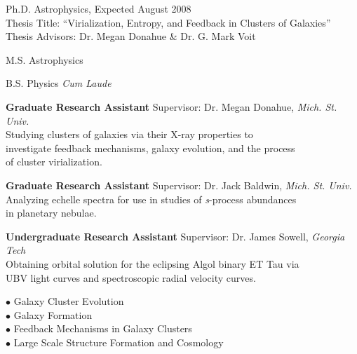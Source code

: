 \documentclass[11pt]{cv}
\begin{document}
\begin{llist}


Ph.D. Astrophysics, Expected August 2008\\
Thesis Title: ``Virialization, Entropy, and Feedback in Clusters of Galaxies''\\
Thesis Advisors: Dr. Megan Donahue \& Dr. G. Mark Voit

M.S. Astrophysics

B.S. Physics {\it Cum Laude}


{\sc \bf{Graduate Research Assistant}}
Supervisor: Dr. Megan Donahue, {\textit{Mich. St. Univ.}}\\
Studying clusters of galaxies via their X-ray properties to\\
investigate feedback mechanisms, galaxy evolution, and the process\\
of cluster virialization.

{\sc \bf{Graduate Research Assistant}}
Supervisor: Dr. Jack Baldwin, {\textit{Mich. St. Univ.}}\\
Analyzing echelle spectra for use in studies of {\textit{s}}-process abundances\\
in planetary nebulae.

{\sc \bf{Undergraduate Research Assistant}}
Supervisor: Dr. James Sowell, {\textit{Georgia Tech}}\\
Obtaining orbital solution for the eclipsing Algol binary ET Tau via\\
UBV light curves and spectroscopic radial velocity curves.


{\sc $\bullet$ Galaxy Cluster Evolution}\\
{\sc $\bullet$ Galaxy Formation}\\
{\sc $\bullet$ Feedback Mechanisms in Galaxy Clusters}\\
{\sc $\bullet$ Large Scale Structure Formation and Cosmology}


\end{llist}
\end{document}
